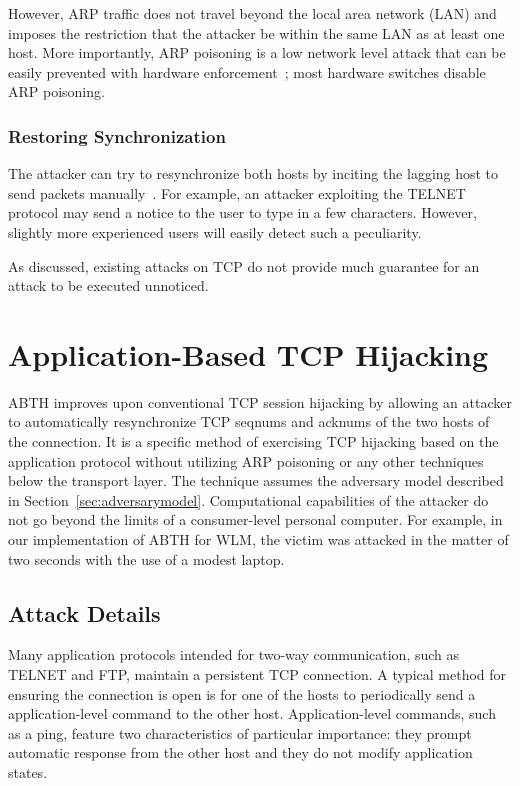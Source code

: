 \documentclass{sig-alternate}
\begin{document}
However, ARP traffic does not travel beyond the local area network (LAN) and imposes the restriction that the attacker be within the same LAN as at least one host.
More importantly, ARP poisoning is a low network level attack that can be easily prevented with hardware enforcement~\cite{spangler:sniffing}; most hardware switches disable ARP poisoning.

\subsubsection{Restoring Synchronization}

The attacker can try to resynchronize both hosts by inciting the lagging host to send packets manually~\cite{lam:resync}.
For example, an attacker exploiting the TELNET protocol may send a notice to the user to type in a few characters.
However, slightly more experienced users will easily detect such a peculiarity.

As discussed, existing attacks on TCP do not provide much guarantee for an attack to be executed unnoticed.

\section{Application-Based TCP Hijacking}
\label{sec:abth}

ABTH improves upon conventional TCP session hijacking by allowing an attacker to automatically resynchronize TCP seqnums and acknums of the two hosts of the connection.
It is a specific method of exercising TCP hijacking based on the application protocol without utilizing ARP poisoning or any other techniques below the transport layer.
The technique assumes the adversary model described in Section~\ref{sec:adversarymodel}. 
Computational capabilities of the attacker do not go beyond the limits of a consumer-level personal computer.
For example, in our implementation of ABTH for WLM, the victim was attacked in the matter of two seconds with the use of a modest laptop.

\subsection{Attack Details}

Many application protocols intended for two-way communication, such as TELNET and FTP, maintain a persistent TCP connection.
A typical method for ensuring the connection is open is for one of the hosts to periodically send a application-level command to the other host.
Application-level commands, such as a ping, feature two characteristics of particular importance: they prompt automatic response from the other host and they do not modify application states.
\end{document}
